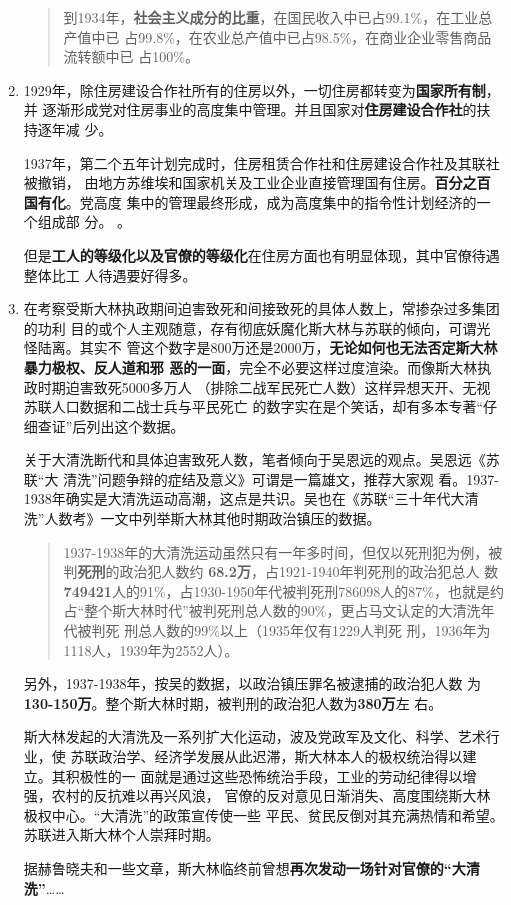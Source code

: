 \begin{enumerate}
\begin{quotation}
    到1934年，\textbf{社会主义成分的比重}，在国民收入中已占99.1\%，在工业总产值中已
    占99.8\%，在农业总产值中已占98.5\%，在商业企业零售商品流转额中已
    占100\%。
  \end{quotation}

\item 1929年，除住房建设合作社所有的住房以外，一切住房都转变为\textbf{国家所有制}，并
  逐渐形成党对住房事业的高度集中管理。并且国家对\textbf{住房建设合作社}的扶持逐年减
  少。

  1937年，第二个五年计划完成时，住房租赁合作社和住房建设合作社及其联社被撤销，
  由地方苏维埃和国家机关及工业企业直接管理国有住房。\textbf{百分之百国有化}。党高度
  集中的管理最终形成，成为高度集中的指令性计划经济的一个组成部
  分。 。

  但是\textbf{工人的等级化以及官僚的等级化}在住房方面也有明显体现，其中官僚待遇整体比工
  人待遇要好得多。

\item 在考察受斯大林执政期间迫害致死和间接致死的具体人数上，常掺杂过多集团的功利
  目的或个人主观随意，存有彻底妖魔化斯大林与苏联的倾向，可谓光怪陆离。其实不
  管这个数字是800万还是2000万，\textbf{无论如何也无法否定斯大林暴力极权、反人道和邪
    恶的一面}，完全不必要这样过度渲染。而像斯大林执政时期迫害致死5000多万人
  （排除二战军民死亡人数）这样异想天开、无视苏联人口数据和二战士兵与平民死亡
  的数字实在是个笑话，却有多本专著“仔细查证”后列出这个数据。

  关于大清洗断代和具体迫害致死人数，笔者倾向于吴恩远的观点。吴恩远《苏联“大
  清洗”问题争辩的症结及意义》\cite{wuenyuanzhengbian}可谓是一篇雄文，推荐大家观
  看。1937-1938年确实是大清洗运动高潮，这点是共识。吴也在《苏联“三十年代大清
  洗”人数考》一文中列举斯大林其他时期政治镇压的数据。
  \begin{quotation}
    1937-1938年的大清洗运动虽然只有一年多时间，但仅以死刑犯为例，被
    判\textbf{死刑}的政治犯人数约 \textbf{68.2万}，占1921-1940年判死刑的政治犯总人
    数\textbf{749421}人的91\%，占1930-1950年代被判死刑786098人的87\%，也就是约
    占“整个斯大林时代”被判死刑总人数的90\%，更占马文认定的大清洗年代被判死
    刑总人数的99\%以上（1935年仅有1229人判死
    刑，1936年为1118人，1939年为2552人）。
  \end{quotation}

  另外，1937-1938年，按吴的数据，以政治镇压罪名被逮捕的政治犯人数
  为\textbf{130-150万}。整个斯大林时期，被判刑的政治犯人数为\textbf{380万}左
  右。

  斯大林发起的大清洗及一系列扩大化运动，波及党政军及文化、科学、艺术行业，使
  苏联政治学、经济学发展从此迟滞，斯大林本人的极权统治得以建立。其积极性的一
  面就是通过这些恐怖统治手段，工业的劳动纪律得以增强，农村的反抗难以再兴风浪，
  官僚的反对意见日渐消失、高度围绕斯大林极权中心。“大清洗”的政策宣传使一些
  平民、贫民反倒对其充满热情和希望。苏联进入斯大林个人崇拜时期。

  据赫鲁晓夫和一些文章，斯大林临终前曾想\textbf{再次发动一场针对官僚的“大清洗”}……
\end{enumerate}

